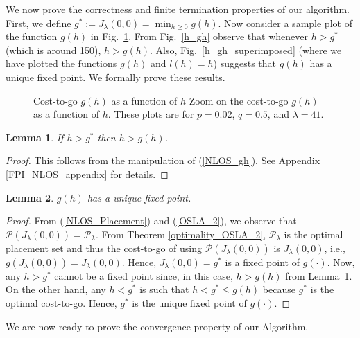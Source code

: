 \documentclass[conference]{IEEEtran}
\newtheorem{lemma}{Lemma}
\begin{document}
We now prove the correctness and finite termination properties of our
algorithm.  First, we define $g^*:=J_{\lambda}(0,0)=\min_{h\geq
  0}g(h)$.  Now consider a sample plot of the function $g(h)$ in
Fig.~\ref{func_g_figure}.  From Fig.~\ref{h_gh} observe that whenever
$h>g^*$ (which is around 150), $h>g(h)$. Also,
Fig.~\ref{h_gh_superimposed} (where we have plotted the functions
$g(h)$ and $l(h)=h$) suggests that $g(h)$ has a unique fixed point. We
formally prove these results.




\begin{figure}[h]
\centering
{}
\caption{ Cost-to-go $g(h)$ as a function of $h$   Zoom on the cost-to-go $g(h)$ as a function of $h$.
These plots are for $p=0.02$, $q=0.5$, and $\lambda=41$.\label{func_g_figure}
}
\end{figure}
 
\begin{lemma} \label{FPI_NLOS}
If $h>g^*$ then $h>g(h)$.
\end{lemma}
\begin{proof}
This follows from the manipulation of (\ref{NLOS_gh}). See Appendix \ref{FPI_NLOS_appendix} 
for details.
\end{proof}
\begin{lemma} \label{uniqueFP_NLOS}
 $g(h)$ has a unique fixed point.
\end{lemma}
\begin{proof}
From (\ref{NLOS_Placement}) and (\ref{OSLA_2}), we observe that 
$\mathcal{P}(J_{\lambda}(0,0))=\overline{\mathcal{P}}_{\lambda}$. 
From Theorem \ref{optimality_OSLA_2}, $\overline{\mathcal{P}}_{\lambda}$ is the optimal 
placement set and thus the cost-to-go of using $\mathcal{P}(J_{\lambda}(0,0))$ is $J_{\lambda}(0,0)$, 
i.e., $g(J_{\lambda}(0,0))=J_{\lambda}(0,0)$. Hence, $J_{\lambda}(0,0)=g^*$ is a fixed 
point of $g(\cdot)$. Now, any $h>g^*$ cannot be a fixed point since, in this case, $h>g(h)$ 
from Lemma~\ref{FPI_NLOS}. On the other hand, any $h<g^*$ is such that $h<g^*\leq g(h)$ because 
$g^*$ is the optimal cost-to-go. Hence, $g^*$ is the unique fixed point of $g(\cdot)$. 
\end{proof}

We are now ready to prove the convergence property of our Algorithm.
\end{document}
